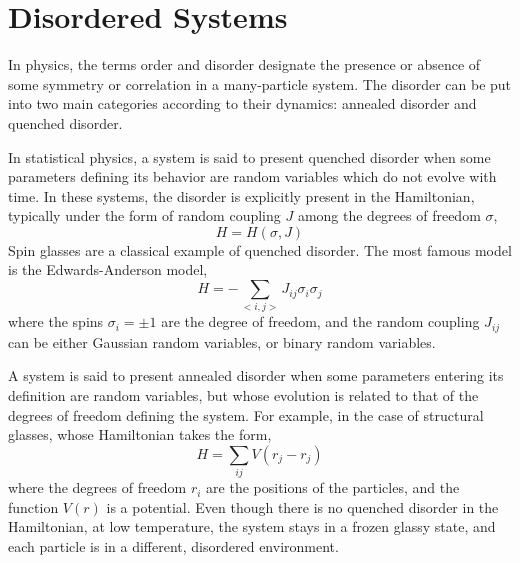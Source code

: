 \section{Disordered Systems}
In physics, the terms order and disorder designate the presence or absence of 
some symmetry or correlation in a many-particle system. 
The disorder can be put into two main categories according to their dynamics: 
annealed disorder and quenched disorder.

In statistical physics, a system is said to present quenched disorder when 
some parameters defining its behavior are random variables which do not evolve 
with time. In these systems, the disorder is explicitly present in the Hamiltonian, 
typically under the form of random coupling $J$ among the degrees of freedom $\sigma$,
\begin{equation}
  \label{eq:4}
  H=H(\sigma,J)
\end{equation}
Spin glasses are a classical example of quenched disorder. The most famous model 
is the Edwards-Anderson model,
\begin{equation}
  \label{eq:11}
  H=-\sum_{<i,j>}J_{ij}\sigma_i\sigma_j
\end{equation}
where the spins $\sigma_i=\pm 1$ are the degree of freedom, and the random coupling
$J_{ij}$ can be either Gaussian random variables, or binary random variables.


A system is said to present annealed disorder when some parameters entering 
its definition are random variables, but whose evolution is related to that 
of the degrees of freedom defining the system. For example, in the case of 
structural glasses, whose Hamiltonian takes the form,
\begin{equation}
  \label{eq:12}
  H=\sum_{ij}V(r_j-r_j)
\end{equation}
where the degrees of freedom $r_i$ are the positions of the particles, and the 
function $V(r)$ is a potential. Even though there is no quenched disorder in
the Hamiltonian, at low temperature, the system stays in a frozen glassy state, 
and each particle is in a different, disordered environment.






